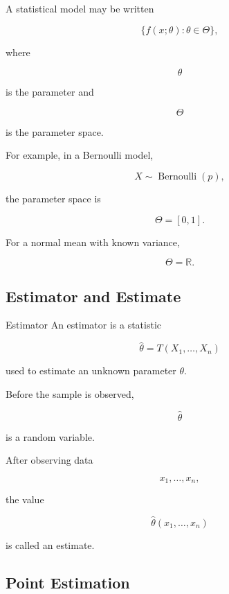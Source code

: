 A statistical model may be written

\[
\boxed{
\{f(x;\theta):\theta\in\Theta\},
}
\]

where

\[
\theta
\]

is the parameter and

\[
\Theta
\]

is the parameter space.

For example, in a Bernoulli model,

\[
X\sim\operatorname{Bernoulli}(p),
\]

the parameter space is

\[
\boxed{
\Theta=[0,1].
}
\]

For a normal mean with known variance,

\[
\boxed{
\Theta=\mathbb{R}.
}
\]

\subsection{Estimator and Estimate}
\label{subsec:estimator-estimate-statistical-estimation}

\begin{definitionbox}{Estimator}
An estimator is a statistic

\[
\boxed{
\widehat{\theta}
=
T(X_1,\ldots,X_n)
}
\]

used to estimate an unknown parameter \(\theta\).
\end{definitionbox}

Before the sample is observed,

\[
\widehat{\theta}
\]

is a random variable.

After observing data

\[
x_1,\ldots,x_n,
\]

the value

\[
\widehat{\theta}(x_1,\ldots,x_n)
\]

is called an estimate.

\subsection{Point Estimation}
\label{subsec:point-estimation}


